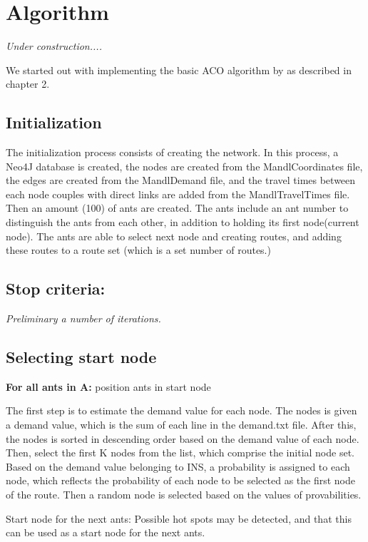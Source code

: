 \section{Algorithm}

\textit{Under construction....}

We started out with implementing the basic ACO algorithm by \citet{nanda11} as described in chapter 2.

\subsection{Initialization}
The initialization process consists of creating the network. In this process, a Neo4J database is created, the nodes are created from the MandlCoordinates file, the edges are created from the MandlDemand file, and the travel times between each node couples with direct links are added from the MandlTravelTimes file. 
Then an amount (100) of ants are created. The ants include an ant number to distinguish the ants from each other, in addition to holding its first node(current node). The ants are able to select next node and creating routes, and adding these routes to a route set (which is a set number of routes.)

\subsection{Stop criteria:}

\textit{Preliminary a number of iterations. }

\subsection{Selecting start node}
\textbf{For all ants in A: }position ants in start node 
\par
The first step is to estimate the demand value for each node. The nodes is given a demand value, which is the sum of each line in the demand.txt file.
After this, the nodes is sorted in descending order based on the demand value of each node.
Then, select the first K nodes from the list, which comprise the initial node set. Based on the demand value belonging to INS, a probability is assigned to each node, which reflects the probability of each node to be selected as the first node of the route. Then a random node is selected based on the values of provabilities. 

Start node for the next ants: Possible hot spots may be detected, and that this can be used as a start node for the next ants. 

